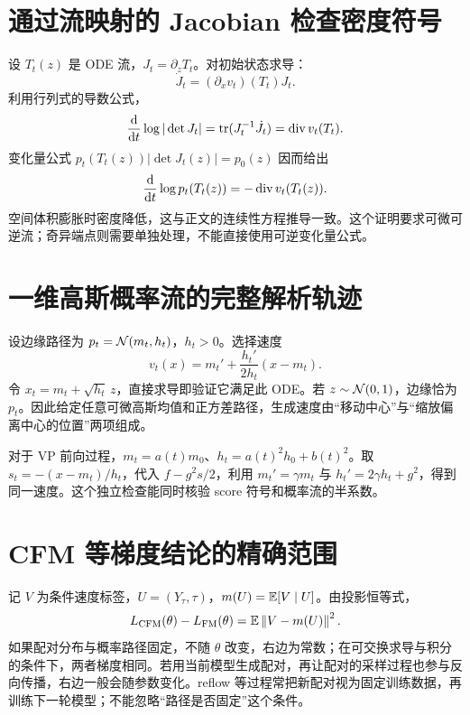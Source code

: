 \section{通过流映射的 Jacobian 检查密度符号}
设 $T_t(z)$ 是 ODE 流，$J_t=\partial_zT_t$。对初始状态求导：
\begin{equation}
 \dot J_t=(\partial_xv_t)(T_t)J_t.
\end{equation}
利用行列式的导数公式，
\begin{equation}
 \frac{\mathop{}\!\mathrm{d}}{\mathop{}\!\mathrm{d} t}\log|\det J_t|
 =\operatorname{tr}(J_t^{-1}\dot J_t)=\operatorname{div} v_t(T_t).
\end{equation}
变化量公式 $p_t(T_t(z))|\det J_t(z)|=p_0(z)$ 因而给出
\begin{equation}
 \frac{\mathop{}\!\mathrm{d}}{\mathop{}\!\mathrm{d} t}\log p_t(T_t(z))=-\operatorname{div} v_t(T_t(z)).
\end{equation}
空间体积膨胀时密度降低，这与正文的连续性方程推导一致。这个证明要求可微可逆流；奇异端点则需要单独处理，不能直接使用可逆变化量公式。

\section{一维高斯概率流的完整解析轨迹}
设边缘路径为 $p_t=\mathcal{N}(m_t,h_t)$，$h_t>0$。选择速度
\begin{equation}
 v_t(x)=m_t'+\frac{h_t'}{2h_t}(x-m_t).
\end{equation}
令 $x_t=m_t+\sqrt{h_t}\,z$，直接求导即验证它满足此 ODE。若 $z\sim\mathcal{N}(0,1)$，边缘恰为 $p_t$。因此给定任意可微高斯均值和正方差路径，生成速度由“移动中心”与“缩放偏离中心的位置”两项组成。

对于 VP 前向过程，$m_t=a(t)m_0$、$h_t=a(t)^2h_0+b(t)^2$。取 $s_t=-(x-m_t)/h_t$，代入 $f-g^2s/2$，利用 $m_t'=\gamma m_t$ 与 $h_t'=2\gamma h_t+g^2$，得到同一速度。这个独立检查能同时核验 score 符号和概率流的半系数。

\section{CFM 等梯度结论的精确范围}
记 $V$ 为条件速度标签，$U=(Y_\tau,\tau)$，$m(U)=\mathbb{E}[V\mid U]$。由投影恒等式，
\begin{equation}
 L_{\mathrm{CFM}}(\theta)-L_{\mathrm{FM}}(\theta)
 =\mathbb{E}\left\lVert V-m(U)\right\rVert^2.
\end{equation}
如果配对分布与概率路径固定，不随 $\theta$ 改变，右边为常数；在可交换求导与积分的条件下，两者梯度相同。若用当前模型生成配对，再让配对的采样过程也参与反向传播，右边一般会随参数变化。reflow 等过程常把新配对视为固定训练数据，再训练下一轮模型；不能忽略“路径是否固定”这个条件。

